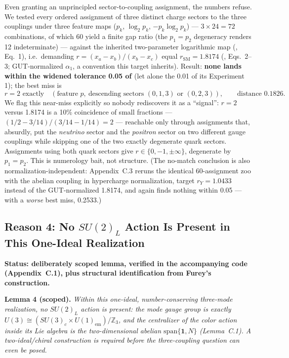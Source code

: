\documentclass[11pt]{article}
\newcommand{\rSM}{r_{\mathrm{SM}}}
\newcommand{\rY}{r_{Y}}
\begin{document}
Even granting an unprincipled sector-to-coupling assignment, the numbers refuse. We tested every ordered assignment of three distinct charge sectors to the three couplings under three feature maps ($p_k$, $\log_2 p_k$, $-p_k \log_2 p_k$) --- $3 \times 24 = 72$ combinations, of which 60 yield a finite gap ratio (the $p_1 = p_2$ degeneracy renders 12 indeterminate) --- against the inherited two-parameter logarithmic map (\cite{companion}, Eq.~1), i.e.\ demanding $r = (x_a - x_b)/(x_b - x_c)$ equal $\rSM = 1.8174$ (\cite{companion}, Eqs.~2--3; GUT-normalized $\alpha_1$, a convention this target inherits). Result: \textbf{none lands within the widened tolerance 0.05 of \cite{companion}} (let alone the 0.01 of its Experiment 1); the best miss is
\begin{equation*}
r = 2 \text{ exactly} \quad (\text{feature } p,\ \text{descending sectors } (0, 1, 3) \text{ or } (0, 2, 3)), \qquad \text{distance } 0.1826.
\end{equation*}
We flag this near-miss explicitly so nobody rediscovers it as a ``signal'': $r = 2$ versus 1.8174 is a 10\% coincidence of small fractions --- $(1/2 - 3/14)/(3/14 - 1/14) = 2$ --- reachable only through assignments that, absurdly, put the \emph{neutrino} sector and the \emph{positron} sector on two different gauge couplings while skipping one of the two exactly degenerate quark sectors. Assignments using both quark sectors give $r \in \{0, -1, \pm\infty\}$, degenerate by $p_1 = p_2$. This is numerology bait, not structure. (The no-match conclusion is also normalization-independent: Appendix~C.3 reruns the identical 60-assignment zoo with the abelian coupling in hypercharge normalization, target $\rY = 1.0433$ instead of the GUT-normalized 1.8174, and again finds nothing within 0.05 --- with a \emph{worse} best miss, 0.2533.)

\subsection{Reason 4: No \texorpdfstring{$SU(2)_L$}{SU(2)L} Action Is Present in This One-Ideal Realization}

\textbf{Status: deliberately scoped lemma, verified in the accompanying code (Appendix~C.1), plus structural identification from Furey's construction.}

\medskip

\noindent\textbf{Lemma 4 (scoped).} \emph{Within this one-ideal, number-conserving three-mode realization, no $SU(2)_L$ action is present: the mode gauge group is exactly $U(3) \cong (SU(3)_c \times U(1)_{\mathrm{em}})/\mathbb{Z}_3$, and the centralizer of the color action inside its Lie algebra is the two-dimensional abelian $\mathrm{span}\{\mathbf{1}, N\}$ (Lemma~C.1). A two-ideal/chiral construction is required before the three-coupling question can even be posed.}
\end{document}
